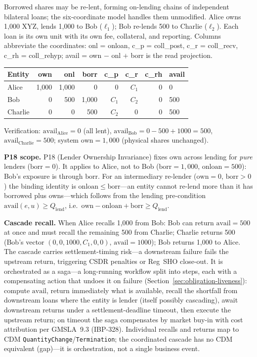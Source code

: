 Borrowed shares may be re-lent, forming on-lending chains of independent bilateral loans; the six-coordinate model handles them unmodified. Alice owns 1{,}000 XYZ, lends 1{,}000 to Bob ($\ell_1$); Bob re-lends 500 to Charlie ($\ell_2$). Each loan is its own unit with its own fee, collateral, and reporting. Columns abbreviate the coordinates: onl = onloan, c\_p = coll\_post, c\_r = coll\_recv, c\_rh = coll\_rehyp; avail = own $-$ onl $+$ borr is the read projection.

\begin{center}\small
\begin{tabular}{l r r r r r r l}
\toprule
\textbf{Entity} & own & onl & borr & c\_p & c\_r & c\_rh & avail \\
\midrule
Alice   & 1{,}000 & 1{,}000 & 0      & 0     & $C_1$ & 0 & 0 \\
Bob     & 0       & 500     & 1{,}000 & $C_1$ & $C_2$ & 0 & 500 \\
Charlie & 0       & 0       & 500     & $C_2$ & 0     & 0 & 500 \\
\bottomrule
\end{tabular}
\end{center}

Verification: $\mathrm{avail}_{\text{Alice}} = 0$ (all lent), $\mathrm{avail}_{\text{Bob}} = 0-500+1000 = 500$, $\mathrm{avail}_{\text{Charlie}} = 500$; system $\mathrm{own} = 1{,}000$ (physical shares unchanged).

\noindent\textbf{P18 scope.} P18 (Lender Ownership Invariance) fixes $\mathrm{own}$ across lending for \emph{pure} lenders ($\mathrm{borr}=0$). It applies to Alice, not to Bob ($\mathrm{borr}=1{,}000$, $\mathrm{onloan}=500$): Bob's exposure is through $\mathrm{borr}$. For an intermediary re-lender ($\mathrm{own}=0$, $\mathrm{borr}>0$) the binding identity is $\mathrm{onloan}\leq\mathrm{borr}$---an entity cannot re-lend more than it has borrowed plus owns---which follows from the lending pre-condition $\mathrm{avail}(e,u)\geq Q_{\mathrm{lend}}$, i.e.\ $\mathrm{own}-\mathrm{onloan}+\mathrm{borr}\geq Q_{\mathrm{lend}}$.

\noindent\textbf{Cascade recall.} When Alice recalls 1{,}000 from Bob: Bob can return $\mathrm{avail}=500$ at once and must recall the remaining 500 from Charlie; Charlie returns 500 (Bob's vector $(0,0,1000,C_1,0,0)$, $\mathrm{avail}=1000$); Bob returns 1{,}000 to Alice. The cascade carries settlement-timing risk---a downstream failure fails the upstream return, triggering CSDR penalties or Reg~SHO close-out. It is orchestrated as a saga---a long-running workflow split into steps, each with a compensating action that undoes it on failure (Section~\ref{sec:obligation-liveness}): compute $\mathrm{avail}$, return immediately what is available, recall the shortfall from downstream loans where the entity is lender (itself possibly cascading), await downstream returns under a settlement-deadline timeout, then execute the upstream return; on timeout the saga compensates by market buy-in with cost attribution per GMSLA~9.3 (IBP-328). Individual recalls and returns map to CDM \texttt{QuantityChange}/\texttt{Termination}; the coordinated cascade has no CDM equivalent (gap)---it is orchestration, not a single business event.

